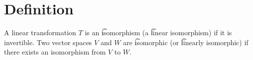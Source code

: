 
\section*{Definition}

A linear transformation $T$ is an \t{isomorphism} (a \t{linear isomorphism}) if it is invertible.
Two vector spaces $V$ and $W$ are \t{isomorphic} (or \t{linearly isomorphic}) if there exists an isomorphism from $V$ to $W$.

\blankpage